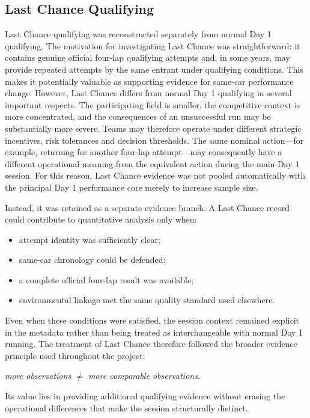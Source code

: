 \subsection{Last Chance Qualifying}
Last Chance qualifying was reconstructed separately from normal Day 1 qualifying. The motivation for investigating Last Chance was straightforward: it contains genuine official four-lap qualifying attempts and, in some years, may provide repeated attempts by the same entrant under qualifying conditions. This makes it potentially valuable as supporting evidence for same-car performance change. However, Last Chance differs from normal Day 1 qualifying in several important respects. The participating field is smaller, the competitive context is more concentrated, and the consequences of an unsuccessful run may be substantially more severe. Teams may therefore operate under different strategic incentives, risk tolerances and decision thresholds. The same nominal action---for example, returning for another four-lap attempt---may consequently have a different operational meaning from the equivalent action during the main Day 1 session. For this reason, Last Chance evidence was not pooled automatically with the principal Day 1 performance core merely to increase sample size.

Instead, it was retained as a separate evidence branch. A Last Chance record could contribute to quantitative analysis only when:

\begin{itemize}
\item attempt identity was sufficiently clear;
\item same-car chronology could be defended;
\item a complete official four-lap result was available;
\item environmental linkage met the same quality standard used elsewhere.
\end{itemize}

Even when these conditions were satisfied, the session context remained explicit in the metadata rather than being treated as interchangeable with normal Day 1 running. The treatment of Last Chance therefore followed the broader evidence principle used throughout the project:

\begin{center}\textit{more observations \ensuremath{\neq} more comparable observations.}\end{center}

Its value lies in providing additional qualifying evidence without erasing the operational differences that make the session structurally distinct.

